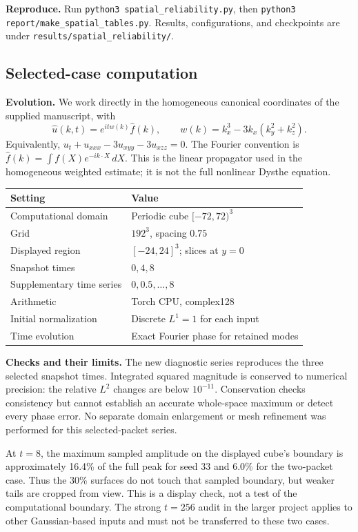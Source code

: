 \documentclass[10pt,letterpaper]{article}
\numberwithin{equation}{section}
\begin{document}
\textbf{Reproduce.} Run \texttt{python3 spatial\_reliability.py}, then
\texttt{python3 report/make\_spatial\_tables.py}. Results, configurations, and
checkpoints are under \texttt{results/spatial\_reliability/}.

\subsection{Selected-case computation}\label{selectedmethods}
\textbf{Evolution.} We work directly in the homogeneous canonical coordinates of
the supplied manuscript, with
\begin{equation}
 \widehat u(k,t)=e^{itw(k)}\widehat f(k),\qquad
 w(k)=k_x^3-3k_x(k_y^2+k_z^2).
\end{equation}
Equivalently, $u_t+u_{xxx}-3u_{xyy}-3u_{xzz}=0$. The Fourier convention is
$\widehat f(k)=\int f(X)e^{-ik\cdot X}\,dX$. This is the linear propagator used
in the homogeneous weighted estimate; it is not the full nonlinear Dysthe equation.

\begin{center}\begin{tabular}{ll}\toprule
Setting & Value\\\midrule
Computational domain & Periodic cube $[-72,72)^3$\\
Grid & $192^3$, spacing $0.75$\\
Displayed region & $[-24,24]^3$; slices at $y=0$\\
Snapshot times & $0,4,8$\\
Supplementary time series & $0,0.5,\ldots,8$\\
Arithmetic & Torch CPU, complex128\\
Initial normalization & Discrete $L^1=1$ for each input\\
Time evolution & Exact Fourier phase for retained modes\\\bottomrule
\end{tabular}\end{center}
\textbf{Checks and their limits.} The new diagnostic series reproduces the three
selected snapshot times. Integrated squared magnitude is conserved to numerical
precision: the relative $L^2$ changes are below $10^{-11}$. Conservation checks
consistency but cannot establish an accurate whole-space maximum or detect every
phase error. No separate domain enlargement or mesh refinement was performed for
this selected-packet series.

At $t=8$, the maximum sampled amplitude on the displayed cube's boundary is
approximately 16.4\% of the full peak for seed 33 and 6.0\% for the two-packet case.
Thus the 30\% surfaces do not touch that sampled boundary, but weaker tails are
cropped from view. This is a display check, not a test of the computational boundary.
The strong $t=256$ audit in the larger project applies to other Gaussian-based
inputs and must not be transferred to these two cases.
\end{document}
